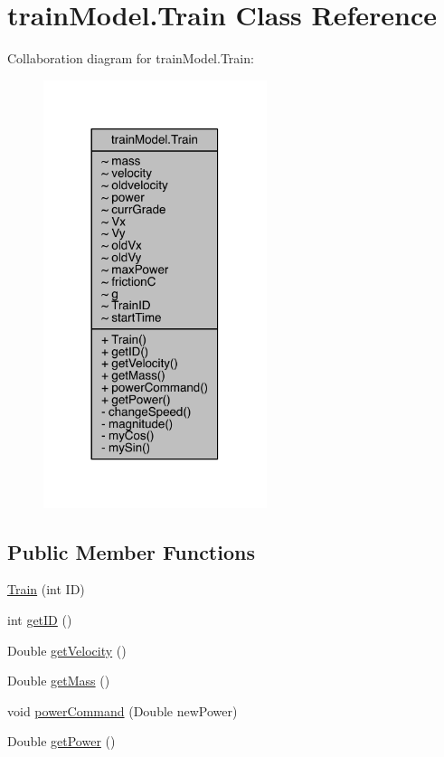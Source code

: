 \hypertarget{classtrainModel_1_1Train}{}\section{train\+Model.\+Train Class Reference}
\label{classtrainModel_1_1Train}


Collaboration diagram for train\+Model.\+Train\+:
\nopagebreak
\begin{figure}[H]
\begin{center}
\leavevmode
\includegraphics[width=185pt]{classtrainModel_1_1Train__coll__graph}
\end{center}
\end{figure}
\subsection*{Public Member Functions}
\begin{DoxyCompactItemize}
\item 
\hyperlink{classtrainModel_1_1Train_ace267efabb37b0bf7b681af1ddf12690}{Train} (int ID)
\item 
int \hyperlink{classtrainModel_1_1Train_ad29a94a10fad2b26fc32989cd3431850}{get\+ID} ()
\item 
Double \hyperlink{classtrainModel_1_1Train_a1e0b8055a7cbfdf6edbce0ae09273219}{get\+Velocity} ()
\item 
Double \hyperlink{classtrainModel_1_1Train_a6b09bef43b1858aae11d2d02dfd6ffb4}{get\+Mass} ()
\item 
void \hyperlink{classtrainModel_1_1Train_acd407d7861947859becc92cc1fb5c937}{power\+Command} (Double new\+Power)
\item 
Double \hyperlink{classtrainModel_1_1Train_a48de926812a7be60f611f37dd738a47a}{get\+Power} ()
\end{DoxyCompactItemize}
